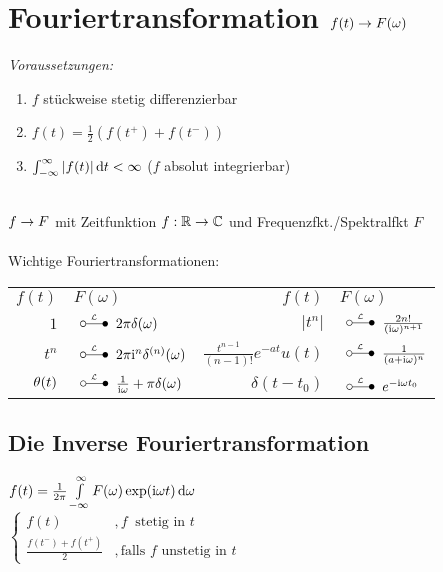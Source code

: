 \documentclass[german,color]{latex4ei/latex4ei_fs}
\begin{document}
\section{Fouriertransformation $f(t) \rightarrow F(\omega)$}
\begin{sectionbox}
	\emph{Voraussetzungen:}
	\begin{enumerate}
		\item $f$ stückweise stetig differenzierbar
		\item $f(t) = \frac{1}{2}\left(f(t^+) + f(t^-)\right)$
		\item $\int_{-\infty}^{\infty}\abs{f(t)} \diff t < \infty$ ($f$ absolut integrierbar)
	\end{enumerate}
	\quad \\
	$f \rightarrow F$ mit Zeitfunktion $f:\operatorname{\mathbb R} \rightarrow \mathbb C$ und Frequenzfkt./Spektralfkt $F$\\
	 \\
	
	Wichtige Fouriertransformationen:\\
	\begin{tabular}{rl|rl}
		$f(t)$ & \qquad $F(\omega)$ & $f(t)$ & \qquad $F(\omega)$\\		%
		$1$ & \!\!\!\!\!\!\!\!\!\! $\LT 2\pi \delta(\omega)$ & $|t^n|$ & \!\!\!\!\!\!\!\!\!\! $\LT \frac{2n!}{(\i \omega)^{n+1}}$\\
		$t^n$ & \!\!\!\!\!\!\!\!\!\! $\LT 2\pi \i^n \delta^{(n)}(\omega)$ & $\frac{t^{n-1}}{(n-1)!} e^{-at} u(t)$ & \!\!\!\!\!\!\!\!\!\! $\LT \frac{1}{(a+\i \omega)^n}$\\
		$\operatorname{\theta}(t)$ & \!\!\!\!\!\!\!\!\!\! $\LT \frac{1}{\i \omega} + \pi \delta(\omega)$ & $\delta(t-t_0)$ & \!\!\!\!\!\!\!\!\!\! $\LT e^{-\i \omega t_0}$
	\end{tabular}
	\subsection{Die Inverse Fouriertransformation}
	$f(t) = \frac{1}{2\pi} \int\limits_{-\infty}^\infty F(\omega) \exp(\i \omega t) \diff \omega$\\
	$\begin{cases} f(t) & ,f\ \text{ stetig in }t \\ \frac{f(t^-) + f(t^+)}{2} & ,\text{falls } f\text{ unstetig in }t \end{cases}$
\end{sectionbox}
\end{document}
